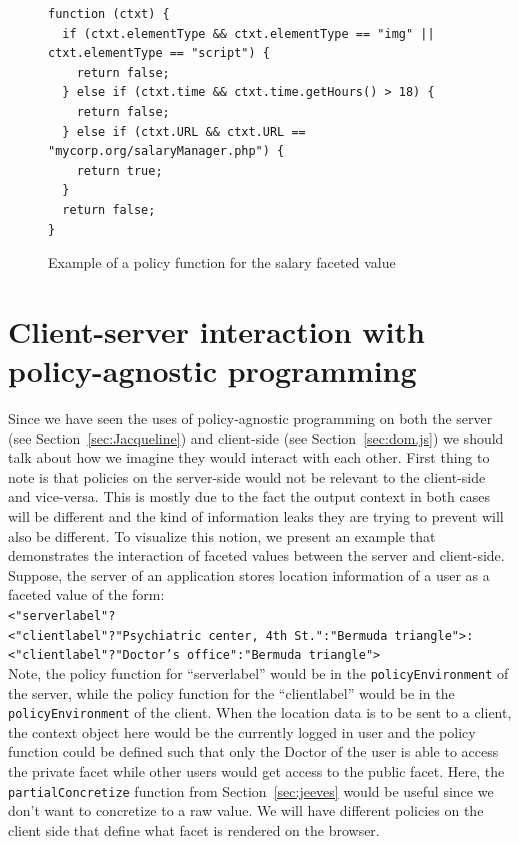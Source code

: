 \begin{figure}
  \begin{lstlisting}
function (ctxt) {
  if (ctxt.elementType && ctxt.elementType == "img" || ctxt.elementType == "script") {
    return false;
  } else if (ctxt.time && ctxt.time.getHours() > 18) {
    return false;
  } else if (ctxt.URL && ctxt.URL == "mycorp.org/salaryManager.php") {
    return true;
  }
  return false;
}
  \end{lstlisting}
  \caption{Example of a policy function for the salary faceted value}
  \label{fig:policyEx}
\end{figure}

\section{Client-server interaction with policy-agnostic programming}
Since we have seen the uses of policy-agnostic programming on both the server
(see Section~\ref{sec:Jacqueline}) and client-side (see Section~\ref{sec:dom.js})
we should talk about how we imagine they would interact with each other. First
thing to note is that policies on the server-side would not be relevant to the
client-side and vice-versa. This is mostly due to the fact the output context in
both cases will be different and the kind of information leaks they are trying to
prevent will also be different. To visualize this notion, we present an example
that demonstrates the interaction of faceted values between the server and client-side.
Suppose, the server of an application stores location information of a user as a
faceted value of the form:\\
\indent \texttt{<"serverlabel"?\\
\indent<"clientlabel"?"Psychiatric center, 4th St.":"Bermuda triangle">:\\
\indent<"clientlabel"?"Doctor's office":"Bermuda triangle">}\\
\noindent
Note, the policy function for ``serverlabel'' would be in the
\texttt{policyEnvironment} of the server, while the policy function for the
``clientlabel'' would be in the \texttt{policyEnvironment} of the client. When
the location data is to be sent to a client, the context object here would be the
currently logged in user and the policy function could be defined such that only
the Doctor of the user is able to access the private facet while other users would
get access to the public facet. Here, the \texttt{partialConcretize} function from
Section~\ref{sec:jeeves} would be useful since we don't want to concretize to a raw
value. We will have different policies on the client side that define what facet
is rendered on the browser.
